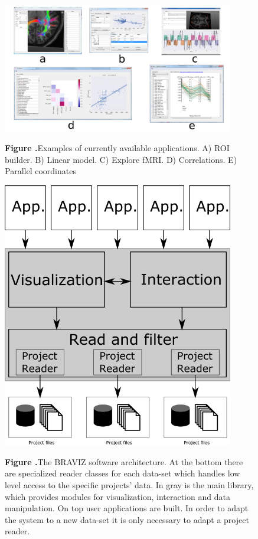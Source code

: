 \documentclass[utf8]{frontiersSCNS} %
\begin{document}
\begin{figure}[h!]
\begin{center}
\includegraphics[width=0.9\textwidth]{figures/many_apps.png}
\end{center}
 \textbf{\label{fig_other_apps} Figure .}{Examples of currently available applications. A) ROI builder. B) Linear model. C) Explore fMRI. D) Correlations. E) Parallel coordinates}
\end{figure}

\begin{figure}[h!]
\begin{center}
\includegraphics[width=0.9\textwidth]{figures/arquitecture.png}
\end{center}
 \textbf{\label{fig_arch} Figure .}{The BRAVIZ software architecture. At the bottom there are specialized reader classes for each data-set which handles low level access to the specific projects' data. In gray is the main  library, which provides modules for visualization, interaction and data manipulation. On top user applications are built. In order to adapt the system to a new data-set it is only necessary to adapt a project reader.}
\end{figure}
\end{document}
